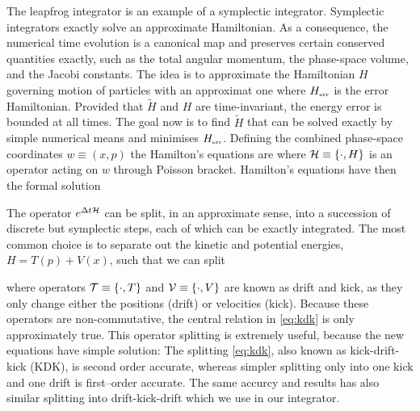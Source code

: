 The leapfrog integrator is an example of a symplectic integrator. Symplectic integrators exactly solve an approximate Hamiltonian. As a consequence, the numerical time evolution is a canonical map and preserves certain conserved quantities exactly, such as the total angular momentum, the phase-space volume, and the Jacobi constants. The idea is to approximate the Hamiltonian \(H\) governing motion of particles with an approximat one
where \(H_\text{\tiny err}\) is the error Hamiltonian. Provided that \(\tilde H\) and \(H\) are time-invariant, the energy error is bounded at all times. The goal now is to find \(\tilde H\) that can be solved exactly by simple numerical means and minimises \(H_\text{\tiny err}\). Defining the combined phase-space coordinates \(w\equiv(x,p)\) the Hamilton’s equations are
where \(\mathcal{H}\equiv\{\cdot,H\}\) is an operator acting on \(w\) through Poisson bracket. Hamilton’s equations have then the formal solution
\begin{sloppypar}
The operator \(e^{\Delta t\mathcal{H}}\) can be split, in an approximate sense, into a succession of discrete but symplectic steps, each of which can be exactly integrated. The most common choice is to separate out the kinetic and potential energies, \({H=T(p)+V(x)}\), such that we can split
\end{sloppypar}
where operators \(\mathcal{T}\equiv\{\cdot,T\}\) and \(\mathcal{V}\equiv\{\cdot,V\}\) are known as drift and kick, as they only change either the positions (drift) or velocities (kick). Because these operators are non-commutative, the central relation in \eqref{eq:kdk} is only approximately true. This operator splitting is extremely useful, because the new equations have simple solution:
The splitting \eqref{eq:kdk}, also known as kick-drift-kick (KDK), is second order accurate, whereas simpler splitting only into one kick and one drift is first--order accurate. The same accurcy and results has also similar splitting into drift-kick-drift which we use in our integrator.
